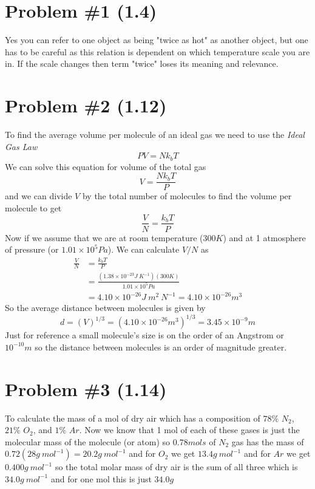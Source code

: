 \documentclass[11pt]{article}
\numberwithin{equation}{section}
\begin{document}


\section{Problem \#1 (1.4)}
Yes you can refer to one object as being "twice as hot" as another object, but one has to be careful as this relation is dependent on which temperature scale you are in. If the scale changes then term "twice" loses its meaning and relevance.

\section{Problem \#2 (1.12)}


To find the average volume per molecule of an ideal gas we need to use the \emph{Ideal Gas Law}
\begin{equation}
PV = Nk_bT
\label{IdealGas}
\end{equation}
We can solve this equation for volume of the total gas
$$V = \frac{Nk_bT}{P}$$
and we can divide $V$ by the total number of molecules to find the volume per molecule to get
$$\frac{V}{N} = \frac{k_bT}{P}$$
Now if we assume that we are at room temperature ($300\unit{K}$) and at 1 atmosphere of pressure (or $1.01\times10^{5}\unit{Pa}$). We can calculate $V/N$ as
\begin{align*}
\frac{V}{N} &= \frac{k_bT}{P}\\
&= \frac{(1.38\times10^{-23}\unit{J\ K^{-1}})(300\unit{K})}{1.01\times10^{5}\unit{Pa}}\\
&= 4.10\times10^{-26}\unit{J\ m^{2}\ N^{-1}} = 4.10\times10^{-26}\unit{m^3}
\end{align*}
So the average distance between molecules is given by
$$d = (V)^{1/3} = (4.10\times10^{-26}\unit{m^3})^{1/3} = 3.45\times10^{-9}\unit{m}$$
Just for reference a small molecule's size is on the order of an Angstrom or $10^{-10}\unit{m}$ so the distance between molecules is an order of magnitude greater.

\section{Problem \#3 (1.14)}
To calculate the mass of a mol of dry air which has a composition of $78\%$ $N_2$, $21\%$ $O_2$, and $1\%$ $Ar$. Now we know that 1 mol of each of these gases is just the molecular mass of the molecule (or atom) so $0.78\unit{mols}$ of $N_2$ gas has the mass of $0.72(28\unit{g\ mol^{-1}}) = 20.2\unit{g\ mol^{-1}}$ and for $O_2$ we get $13.4\unit{g\ mol^{-1}}$ and for $Ar$ we get $0.400\unit{g\ mol^{-1}}$ so the total molar mass of dry air is the sum of all three which is $34.0\unit{g\ mol^{-1}}$ and for one mol this is just $34.0\unit{g}$
\end{document}
